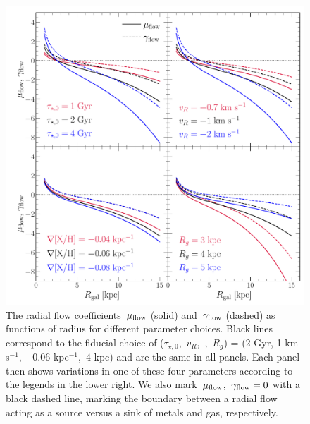 \begin{figure}
\centering
\includegraphics[scale = 0.5]{chapter7/muflow_gammaflow_vs_radius.pdf}
\caption{
The radial flow coefficients~$\mu_{\text{flow}}$ (solid) and~$\gamma_{\text{flow}}$ (dashed) as
functions of radius for different parameter choices.
Black lines correspond to the fiducial choice of
($\tau_{\star,0}$,~$v_R$,~,~$R_g$) = (2 Gyr, 1 km s$^{-1}$,
$-0.06$ kpc$^{-1}$,~$4$ kpc) and are the same in all panels.
Each panel then shows variations in one of these four parameters according to
the legends in the lower right.
We also mark~$\mu_{\text{flow}}$,~$\gamma_{\text{flow}} = 0$ with a black dashed line, marking
the boundary between a radial flow acting as a source versus a sink of metals
and gas, respectively.
}
\label{outflows:fig:flow-coefficients-vs-radius}
\end{figure}

